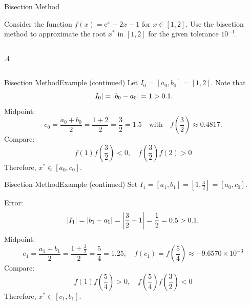 \documentclass[12pt,aspectratio=169,envcountset]{beamer}
\DeclarePairedDelimiter{\abs}{\lvert}{\rvert}
\begin{document}
\begin{frame}{Bisection Method}
  \begin{example}
    \label{ex:bisection-method-1}
    Consider the function $f(x) = \mathrm{e}^x - 2x - 1$ for $x \in [1,2]$.
    Use the bisection method to approximate the root $x^*$ in $[1,2]$ for the
    given tolerance $10^{-1}$.
  \end{example}
  \begin{columns}[onlytextwidth]
    \begin{column}{.4\textwidth}
      \begin{center}
      \end{center}
    \end{column}
  \end{columns}
\end{frame}

\begin{frame}{Bisection Method}{Example (continued)}
  Let $I_0 = [a_0,b_0] = [1,2]$.
  Note that
  \[
    \abs{I_0} = \abs{b_0 - a_0} = 1 > 0.1.
  \]
  Midpoint:
  \[
    c_0 = \frac{a_0 + b_0}{2} = \frac{1 + 2}{2} = \frac{3}{2} = 1.5
    \quad\text{with}\quad
    f\!\left(\frac{3}{2}\right) \approx 0.4817.
  \]
  Compare:
  \[
    f(1)f\!\left(\frac{3}{2}\right) < 0, \quad
    f\!\left(\frac{3}{2}\right)f(2) > 0
  \]
  Therefore, $x^* \in [a_0, c_0]$.
\end{frame}

\begin{frame}{Bisection Method}{Example (continued)}
  Set $I_1 = [a_1, b_1] = \left[1,\frac{3}{2}\right] = [a_0, c_0]$.

  Error:
  \[
    \abs{I_1} = \abs{b_1 - a_1}
    = \abs*{\frac{3}{2} - 1}
    = \frac{1}{2}
    = 0.5 
    > 0.1,
  \]
  Midpoint:
  \[
    c_1 = \frac{a_1 + b_1}{2}
    = \frac{1 + \frac{3}{2}}{2}
    = \frac{5}{4}
    = 1.25,
    \quad
    f(c_1) = f\!\left(\frac{5}{4}\right) \approx -9.6570\times 10^{-3}
  \]
  Compare:
  \[
    f(1)f\!\left(\frac{5}{4}\right) > 0, \quad
    f\!\left(\frac{5}{4}\right)f\!\left(\frac{3}{2}\right) < 0
  \]
  Therefore, $x^* \in [c_1, b_1]$.
\end{frame}
\end{document}
